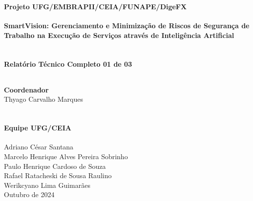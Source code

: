 \documentclass[a4paper, 11pt]{article}
\newcommand{\titlehd}{\bfseries\selectfont Projeto UFG/EMBRAPII/CEIA/FUNAPE/DigeFX}
\begin{document}
\begin{center}
\vspace*{1.5cm}
{\LARGE\bfseries\selectfont \titlehd\\\ \\

SmartVision: Gerenciamento e 
Minimização de Riscos de Segurança de Trabalho na 
Execução de Serviços através de Inteligência Artificial\\ \ \\ \ \\

Relatório Técnico Completo 01 de 03\ \\ \ \\
}

\textbf{\LARGE{Coordenador}} \\
\Large{Thyago Carvalho Marques}\\ \ \\ \ \\

\textbf{\LARGE{Equipe UFG/CEIA}} \\ \ \\

\Large{Adriano César Santana} \\
\Large{Marcelo Henrique Alves Pereira Sobrinho} \\
\Large{Paulo Henrique Cardoso de Souza} \\
\Large{Rafael Ratacheski de Sousa Raulino} \\
\Large{Werikcyano Lima Guimarães} \\

\vspace*{5.0cm}
Outubro de 2024

\pagebreak
{}

\fancyfoot{\centerline{\thepage}}
\setcounter{page}{1}

\parskip 6pt



\newpage


\newpage


\newpage
\tableofcontents

\newpage
\listoffigures
\listoftables

\newpage
\clearpage


\clearpage


\newpage
\clearpage


\newpage
\clearpage


\newpage

%

\end{center}
\end{document}
